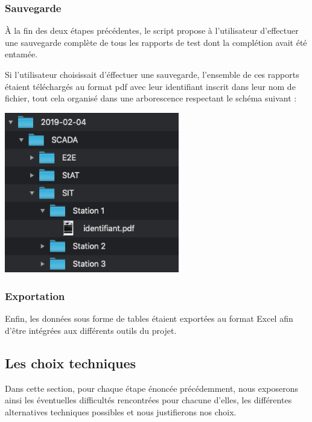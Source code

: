 \subsubsection{Sauvegarde}
À la fin des deux étapes précédentes, le script propose à l'utilisateur d'effectuer une sauvegarde complète de tous les rapports de test dont la complétion avait été entamée. 

Si l'utilisateur choisissait d'éffectuer une sauvegarde, l'ensemble de ces rapports étaient téléchargés au format pdf avec leur identifiant inscrit dans leur nom de fichier, tout cela organisé dans une arborescence respectant le schéma suivant : 

\begin{center}
\includegraphics[height=7cm]{ressources/images/figures/tree.png}
\end{center}

\subsubsection{Exportation}

Enfin, les données sous forme de tables étaient exportées au format Excel afin d'être intégrées aux différents outils du projet. 

\subsection{Les choix techniques}

Dans cette section, pour chaque étape énoncée précédemment, nous exposerons ainsi les éventuelles difficultés rencontrées pour chacune d'elles, les différentes alternatives techniques possibles et nous justifierons nos choix.

